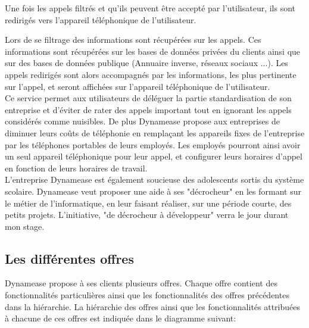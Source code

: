 Une fois les appels filtrés et qu'ils peuvent être accepté par l'utilisateur, ils sont redirigés vers l'appareil téléphonique de l'utilisateur.

Lors de se filtrage des informations sont récupérées sur les appels. Ces informations sont récupérées sur les bases de données privées du clients ainsi que sur des bases de données publique (Annuaire inverse, réseaux sociaux ...). Les appels redirigés sont alors accompagnés par les informations, les plus pertinente sur l'appel, et seront affichées sur l'appareil téléphonique de l'utilisateur.\\

Ce service permet aux utilisateurs de déléguer la partie standardisation de son entreprise et d'éviter de rater des appels important tout en ignorant les appels considérés comme nuisibles. De plus Dynamease propose aux entreprises de diminuer leurs coûts de téléphonie en remplaçant les appareils fixes de l'entreprise par les téléphones portables de leurs employés. Les employés pourront ainsi avoir un seul appareil téléphonique pour leur appel, et configurer leurs horaires d'appel en fonction de leurs horaires de travail.\\

L'entreprise Dynamease est également soucieuse des adolescents sortis du système scolaire. Dynamease veut proposer une aide à ses "décrocheur" en les formant sur le métier de l'informatique, en leur faisant réaliser, sur une période courte, des petits projets. L'initiative, "de décrocheur à développeur" verra le jour durant mon stage.

\subsection{Les différentes offres}

Dynamease propose à ses clients plusieurs offres. Chaque offre contient des fonctionnalités particulières ainsi que les fonctionnalités des offres précédentes dans la hiérarchie.  La hiérarchie des offres ainsi que les fonctionnalités attribuées à chacune de ces offres est indiquée dans le diagramme suivant:


